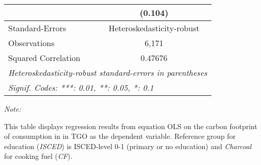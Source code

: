 \begin{table}[htbp!]
\begin{adjustbox}{width = 1\textwidth, max height = 0.95\textheight, center}
\begin{threeparttable}[b]
\begin{tabular}{lc}
                                & (0.104)\\   
            \midrule 
            Standard-Errors     & Heteroskedasticity-robust \\   
            Observations        & 6,171\\  
            Squared Correlation & 0.47676\\  
            \midrule \midrule
            \multicolumn{2}{l}{\emph{Heteroskedasticity-robust standard-errors in parentheses}}\\
            \multicolumn{2}{l}{\emph{Signif. Codes: ***: 0.01, **: 0.05, *: 0.1}}\\
         \end{tabular}
         
         \begin{tablenotes}\item \medskip \textit{Note:}
            \item This table displays regression results from equation OLS on the carbon footprint of consumption in  in TGO as the dependent variable.  Reference group for education (\textit{ISCED}) is ISCED-level 0-1 (primary or no education) and \textit{Charcoal} for cooking fuel (\textit{CF}).
         \end{tablenotes}
      \end{threeparttable}
   \end{adjustbox}
\end{table}


